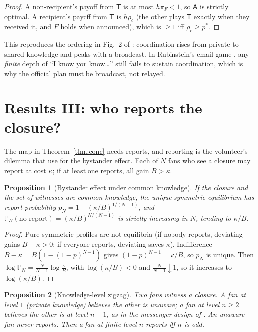 \documentclass[11pt]{article}
\newtheorem{proposition}{Proposition}
\theoremstyle{definition}
\theoremstyle{remark}
\renewcommand{\Pr}{\mathbb{P}}
\newcommand{\1}{\mathbf{1}}
\newcommand{\Tog}{\mathsf{T}}
\newcommand{\Alo}{\mathsf{A}}
\begin{document}
\begin{proof}
A non-recipient's payoff from $\Tog$ is at most $h\pi_F<1$, so $\Alo$ is
strictly optimal. A recipient's payoff from $\Tog$ is $h\rho_c$ (the other
plays $\Tog$ exactly when they received it, and $F$ holds when announced),
which is $\ge1$ iff $\rho_c\ge p^*$.
\end{proof}

This reproduces the ordering in Fig.~2 of \cite{dfp}: coordination rises
from private to shared knowledge and peaks with a broadcast. In
Rubinstein's email game \cite{rub}, any \emph{finite} depth of ``I know you
know\dots'' still fails to sustain coordination, which is why the official
plan must be broadcast, not relayed.

\section{Results III: who reports the closure?}

The map in Theorem~\ref{thm:conc} needs reports, and reporting is the
volunteer's dilemma \cite{dik} that \cite{dfp} use for the bystander
effect. Each of $N$ fans who see a closure may report at cost $\kappa$;
if at least one reports, all gain $B>\kappa$.

\begin{proposition}[Bystander effect under common knowledge]\label{prop:vd}
If the closure and the set of witnesses are common knowledge, the unique
symmetric equilibrium has report probability $p_N=1-(\kappa/B)^{1/(N-1)}$,
and $\Pr_N(\text{no report})=(\kappa/B)^{N/(N-1)}$ is strictly increasing in
$N$, tending to $\kappa/B$.
\end{proposition}

\begin{proof}
Pure symmetric profiles are not equilibria (if nobody reports, deviating
gains $B-\kappa>0$; if everyone reports, deviating saves $\kappa$).
Indifference $B-\kappa=B(1-(1-p)^{N-1})$ gives $(1-p)^{N-1}=\kappa/B$, so
$p_N$ is unique. Then $\log\Pr_N=\frac{N}{N-1}\log\frac{\kappa}{B}$, with
$\log(\kappa/B)<0$ and $\frac{N}{N-1}\downarrow1$, so it increases to
$\log(\kappa/B)$.
\end{proof}

\begin{proposition}[Knowledge-level zigzag]\label{prop:zigzag}
Two fans witness a closure. A fan at level $1$ (private knowledge) believes
the other is unaware; a fan at level $n\ge2$ believes the other is at level
$n-1$, as in the messenger design of \cite{dfp}. An unaware fan never
reports. Then a fan at finite level $n$ reports iff $n$ is odd.
\end{proposition}
\end{document}
